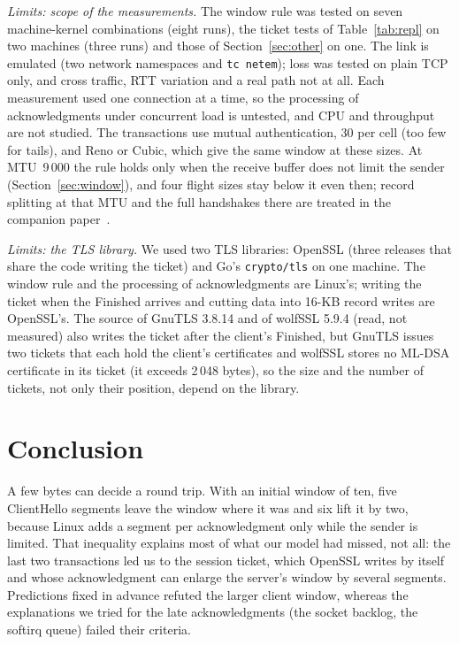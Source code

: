 \documentclass[sigconf,9pt,nonacm]{acmart}
\begin{document}
\emph{Limits: scope of the measurements.} The window rule was tested on seven machine-kernel combinations (eight runs), the ticket tests of Table~\ref{tab:repl} on two machines (three runs) and those of Section~\ref{sec:other} on one. The link is emulated (two network namespaces and \texttt{tc netem}); loss was tested on plain TCP only, and cross traffic, RTT variation and a real path not at all. Each measurement used one connection at a time, so the processing of acknowledgments under concurrent load is untested, and CPU and throughput are not studied. The transactions use mutual authentication, 30 per cell (too few for tails), and Reno or Cubic, which give the same window at these sizes. At MTU~9\,000 the rule holds only when the receive buffer does not limit the sender (Section~\ref{sec:window}), and four flight sizes stay below it even then; record splitting at that MTU and the full handshakes there are treated in the companion paper~\cite{paperone}.\par\emph{Limits: the TLS library.} We used two TLS libraries: OpenSSL (three releases that share the code writing the ticket) and Go's \texttt{crypto/tls} on one machine. The window rule and the processing of acknowledgments are Linux's; writing the ticket when the Finished arrives and cutting data into 16-KB record writes are OpenSSL's. The source of GnuTLS 3.8.14 and of wolfSSL 5.9.4 (read, not measured) also writes the ticket after the client's Finished, but GnuTLS issues two tickets that each hold the client's certificates and wolfSSL stores no ML-DSA certificate in its ticket (it exceeds 2\,048 bytes), so the size and the number of tickets, not only their position, depend on the library.

\section{Conclusion}
A few bytes can decide a round trip. With an initial window of ten, five ClientHello segments leave the window where it was and six lift it by two, because Linux adds a segment per acknowledgment only while the sender is limited. That inequality explains most of what our model had missed, not all: the last two transactions led us to the session ticket, which OpenSSL writes by itself and whose acknowledgment can enlarge the server's window by several segments. Predictions fixed in advance refuted the larger client window, whereas the explanations we tried for the late acknowledgments (the socket backlog, the softirq queue) failed their criteria.
\end{document}
